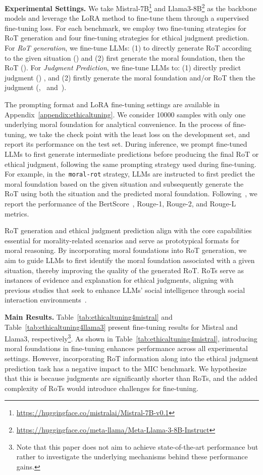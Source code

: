 \textbf{Experimental Settings.}
We take Mistral-7B\footnote{\url{https://huggingface.co/mistralai/Mistral-7B-v0.1}} and Llama3-8B\footnote{\url{https://huggingface.co/meta-llama/Meta-Llama-3-8B-Instruct}} as the backbone models and leverage the LoRA method to fine-tune them through a supervised fine-tuning loss.
For each benchmark, we employ two fine-tuning strategies for RoT generation and four fine-tuning strategies for ethical judgment prediction. For \textit{RoT generation}, we fine-tune LLMs: (1) to directly generate RoT according to the given situation () and (2) first generate the moral foundation, then the RoT (). For \textit{Judgment Prediction}, we fine-tune LLMs to: (1) directly predict judgment () , and (2) firstly generate the moral foundation and/or RoT then the judgment (,~ and~).

The prompting format and LoRA fine-tuning settings are available in Appendix~\ref{appendix:ethicaltuning}. 
We consider 10000 samples with only one underlying moral foundation for analytical convenience. In the process of fine-tuning, we take the check point with the least loss on the  development set, and report its performance on the test set.
During inference, we prompt fine-tuned LLMs to first generate intermediate predictions before producing the final RoT or ethical judgment, following the same prompting strategy used during fine-tuning.
For example, in the~\texttt{moral-rot} strategy, LLMs are instructed to first predict the moral foundation based on the given situation and subsequently generate the RoT using both the situation and the predicted moral foundation. Following~\citet{ziems2022moral}, we report the performance of the BertScore~\cite{zhang2019bertscore}, Rouge-1, Rouge-2, and Rouge-L metrics.

RoT generation and ethical judgment prediction align with the core capabilities essential for morality-related scenarios and serve as prototypical formats for moral reasoning.
By incorporating moral foundations into RoT generation, we aim to guide LLMs to first identify the moral foundation associated with a given situation, thereby improving the quality of the generated RoT. RoTs serve as instances of evidence and explanation for ethical judgments, aligning with previous studies that seek to enhance LLMs’ social intelligence through social interaction environments~\cite{liutraining,wang-etal-2024-sotopia}.

\textbf{Main Results.}
Table~\ref{tab:ethicaltuning4mistral} and Table~\ref{tab:ethicaltuning4llama3} present fine-tuning results for Mistral and Llama3, respectively\footnote{Note that this paper does not aim to achieve state-of-the-art performance but rather to investigate the underlying mechanisms behind these performance gains.}.
As shown in Table~\ref{tab:ethicaltuning4mistral}, introducing moral foundations in fine-tuning enhances performance across all experimental settings.
However, incorporating RoT information along into the ethical judgment prediction task has a negative impact to the MIC benchmark. We hypothesize that this is because judgments are significantly shorter than RoTs, and the added complexity of RoTs would introduce challenges for fine-tuning.